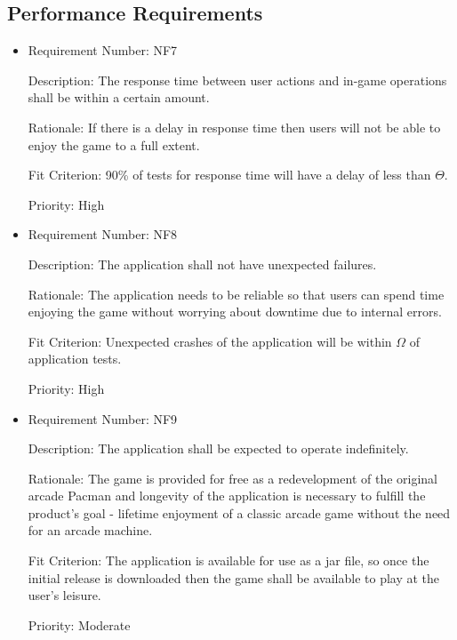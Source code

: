 \documentclass[12pt, titlepage]{article}
\begin{document}
\subsection{Performance Requirements}
\begin{itemize}
	\item
	Requirement Number: NF7

	Description: The response time between user actions and in-game operations shall be within a certain amount.

	Rationale: If there is a delay in response time then users will not be able to enjoy the game to a full extent.

	Fit Criterion: 90\% of tests for response time will have a delay of less than $\hyperref[tab:constants]{\Theta}$.

	Priority: High

	\item
	Requirement Number: NF8

	Description: The application shall not have unexpected failures.

	Rationale: The application needs to be reliable so that users can spend time enjoying the game without worrying about downtime due to internal errors.

	Fit Criterion: Unexpected crashes of the application will be within $\hyperref[tab:constants]{\Omega}$ of application tests.

	Priority: High

	\item
	Requirement Number: NF9

	Description: The application shall be expected to operate indefinitely.

	Rationale: The game is provided for free as a redevelopment of the original arcade Pacman and longevity of the application is necessary to fulfill the product's goal - lifetime enjoyment of a classic arcade game without the need for an arcade machine.

	Fit Criterion: The application is available for use as a jar file, so once the initial release is downloaded then the game shall be available to play at the user's leisure.

	Priority: Moderate

\end{itemize}
\end{document}
